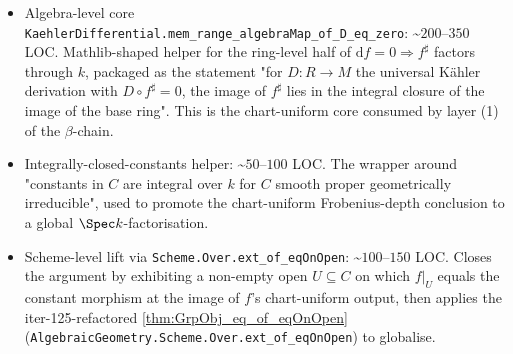 \begin{itemize}
\begin{enumerate}
      \item \textbf{Constancy-from-\(\mathrm df = 0\) layer (the converse only).} \emph{Iter-155 correction.} This layer was previously titled the ``No-Serre-duality layer'' and claimed the chart-algebra (\(\beta\)) chain ``replaces'' the \(H^0(C, \Omega_{C/k}) = 0\) route, ``eliminating piece (iv) as a critical-path dependency''. \textbf{That claim is false} (per \texttt{analogies/df-zero-production-iter155.md}) and is corrected here. What the chain actually delivers is the \emph{converse} implication: \textbf{given} the chart-uniform input \(f^{\sharp}(b) \in \Gamma(C, V)^{p^{e}}\) (which is the chart-level shadow of the hypothesis \(\mathrm df = 0\)), the conclusion ``\(f\) factors through \(\Spec k\)'' follows from the integrally-closed-constants helper (next item) and the scheme-level lift via \texttt{Scheme.Over.ext\_of\_eqOnOpen} (final item). It does \emph{not} produce the hypothesis \(\mathrm df = 0\), and it does not avoid the \(H^0(C, \Omega_{C/k}) = 0\) input: that input is exactly what is needed to \emph{establish} \(\mathrm df = 0\) in the first place. Concretely, \(\mathrm df = 0\) is a global-sections fact --- with the gap-(i) trivialisation \(f^{*}\Omega_{A/k} \cong \mathcal O_C^{\oplus g}\), \(\mathrm df \in \bigl(H^0(C, \Omega_{C/k})\bigr)^{\oplus g}\), so \(\mathrm df = 0 \iff H^0(C, \Omega_{C/k}) = 0\) --- and the chart-by-chart machinery cannot detect it because \(\Omega_{C/k}(V)\) is free of rank \(1\) (nonzero) on every affine chart \(V\). Hence piece (iv) (or an equivalent yielding \(H^0(C, \Omega_{C/k}) = 0\)) is \textbf{on} the critical path for the keystone, not eliminated by this chain.
    \end{enumerate}
  \item Algebra-level core \texttt{KaehlerDifferential.mem\_range\_algebraMap\_of\_D\_eq\_zero}: \textasciitilde\(200\)--\(350\) LOC. Mathlib-shaped helper for the ring-level half of \(\mathrm df = 0 \Rightarrow f^{\sharp}\) factors through \(k\), packaged as the statement "for \(D \colon R \to M\) the universal Kähler derivation with \(D \circ f^{\sharp} = 0\), the image of \(f^{\sharp}\) lies in the integral closure of the image of the base ring". This is the chart-uniform core consumed by layer (1) of the \(\beta\)-chain.
  \item Integrally-closed-constants helper: \textasciitilde\(50\)--\(100\) LOC. The wrapper around "constants in \(C\) are integral over \(k\) for \(C\) smooth proper geometrically irreducible", used to promote the chart-uniform Frobenius-depth conclusion to a global \(\Spec k\)-factorisation.
  \item Scheme-level lift via \texttt{Scheme.Over.ext\_of\_eqOnOpen}: \textasciitilde\(100\)--\(150\) LOC. Closes the argument by exhibiting a non-empty open \(U \subseteq C\) on which \(f|_{U}\) equals the constant morphism at the image of \(f\)'s chart-uniform output, then applies the iter-125-refactored \cref{thm:GrpObj_eq_of_eqOnOpen} (\texttt{AlgebraicGeometry.Scheme.Over.ext\_of\_eqOnOpen}) to globalise.
\end{itemize}


